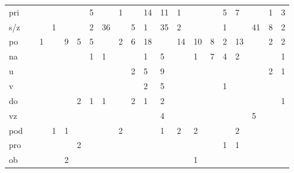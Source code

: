 \documentclass[output=paper,colorlinks,citecolor=brown]{langscibook}
\begin{document}
\begin{table}
\begin{tabularx}{\linewidth}{lXXXXXXXXXXXXXXXXXXX}
pri&	&	&	&	&	&\cellcolor{lime}	5&	&	\cellcolor{yellow}1&	\cellcolor[gray]{0.9}&	\cellcolor{lime}14&\cellcolor{lime}	11&\cellcolor{yellow}1&	&	&	\cellcolor{lime}5&	\cellcolor{lime}7&	&	\cellcolor{yellow}1&\cellcolor{lime}	3\\
s/z&	&	&	\cellcolor{yellow}1&	&	&	\cellcolor{lime}2&\cellcolor{lime}	36&	&	\cellcolor{lime}5&\cellcolor[gray]{0.9}	1&\cellcolor{lime}	35&\cellcolor{lime}	2&	&	&	\cellcolor{yellow}1&	&\cellcolor{lime}	41&\cellcolor{lime}	8&\cellcolor{lime}	2\\
po&	&	\cellcolor{yellow}1&	&	\cellcolor{lime}9&	\cellcolor{lime}5&	\cellcolor{lime}5&	&	\cellcolor{lime}2&	\cellcolor{lime}6&	\cellcolor{lime}18&\cellcolor[gray]{0.9}	&	\cellcolor{lime}14&	\cellcolor{lime}10&	\cellcolor{lime}8&	\cellcolor{lime}2&	\cellcolor{lime}13&	&	\cellcolor{lime}2&	\cellcolor{lime}2\\
na&	&	&	&	&	&	\cellcolor{yellow}1&	\cellcolor{yellow}1&	&	&	\cellcolor{yellow}1&	\cellcolor{lime}5&\cellcolor[gray]{0.9}	&	\cellcolor{yellow}1&	\cellcolor{lime}7&	\cellcolor{lime}4&	\cellcolor{lime}2&	&	&	\cellcolor{yellow}1\\
u&	&	&	&	&	&	&	&	&	\cellcolor{lime}2&	\cellcolor{lime}5&	\cellcolor{lime}9&	&\cellcolor[gray]{0.9}	&	&	&	&	&	\cellcolor{lime}2&	\cellcolor{yellow}1\\
v&	&	&	&	&	&	&	&	&	&	\cellcolor{lime}2&	\cellcolor{lime}5&	&	&\cellcolor[gray]{0.9}	&	\cellcolor{yellow}1&	&	&	&	\\
do&	&	&	&	&	\cellcolor{lime}2&	\cellcolor{yellow}1&	\cellcolor{yellow}1&	&	\cellcolor{lime}2&	\cellcolor{yellow}1&	\cellcolor{lime}2&	&	&	&\cellcolor[gray]{0.9}	&	&	&	&	\cellcolor{yellow}1\\
vz&	&	&	&	&	&	&	&	&	&	&	\cellcolor{lime}4&	&	&	& &\cellcolor[gray]{0.9}	&	\cellcolor{lime}5&	& \\	
pod&	&	&	\cellcolor{yellow}1&	\cellcolor{yellow}1&	&	&	&	\cellcolor{lime}2&	&	&	\cellcolor{yellow}1&	\cellcolor{lime}2&	\cellcolor{lime}2&	&	&\cellcolor{lime} 2 & \cellcolor[gray]{0.9}	&	&	\\
pro&	&	&	&	&	\cellcolor{lime}2&	&	&	&	&	&	&	&	&	&	\cellcolor{yellow}1&	\cellcolor{yellow}1&	&\cellcolor[gray]{0.9}	&	\\
ob&	&	&	&	\cellcolor{lime}2&	&	&	&	&	&	&	&	&	\cellcolor{yellow}1&	&	&	&	&	&\cellcolor[gray]{0.9}	\\
\hline
\end{tabularx}
\end{table}
\end{document}

